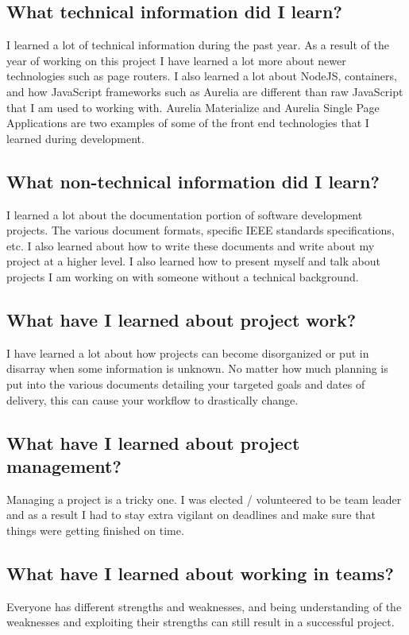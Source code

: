 \documentclass[onecolumn, draftclsnofoot,10pt, compsoc]{IEEEtran}
\begin{document}
\subsection{What technical information did I learn?}
I learned a lot of technical information during the past year. As a result of the year of working on this project I have learned a lot more about newer technologies such as page routers. I also learned a lot about NodeJS, containers, and how JavaScript frameworks such as Aurelia are different than raw JavaScript that I am used to working with. Aurelia Materialize and Aurelia Single Page Applications are two examples of some of the front end technologies that I learned during development.

\subsection{What non-technical information did I learn?}
I learned a lot about the documentation portion of software development projects. The various document formats, specific IEEE standards specifications, etc. I also learned about how to write these documents and write about my project at a higher level. I also learned how to present myself and talk about projects I am working on with someone without a technical background.

\subsection{What have I learned about project work?}
I have learned a lot about how projects can become disorganized or put in disarray when some information is unknown. No matter how much planning is put into the various documents detailing your targeted goals and dates of delivery, this can cause your workflow to drastically change.

\subsection{What have I learned about project management?}
Managing a project is a tricky one. I was elected  / volunteered to be team leader and as a result I had to stay extra vigilant on deadlines and make sure that things were getting finished on time. 

\subsection{What have I learned about working in teams?}
Everyone has different strengths and weaknesses, and being understanding of the weaknesses and exploiting their strengths can still result in a successful project.
\end{document}
